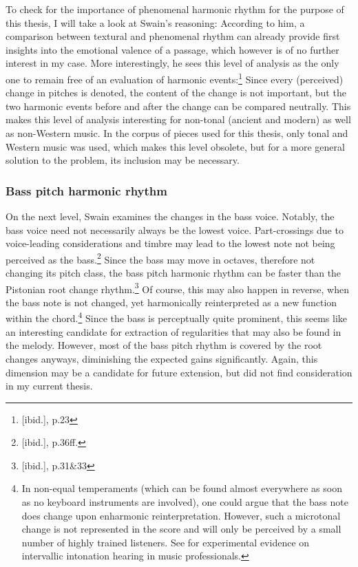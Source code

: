 \documentclass[a4paper,12pt]{report}
\begin{document}
To check for the importance of phenomenal harmonic rhythm for the purpose of this thesis, I will take a look at Swain's reasoning: According to him, a comparison between textural and phenomenal rhythm can already provide first insights into the emotional valence of a passage, which however is of no further interest in my case. More interestingly, he sees this level of analysis as the only one to remain free of an evaluation of harmonic events:\footnote{[ibid.], p.23} Since every (perceived) change in pitches is denoted, the content of the change is not important, but the two harmonic events before and after the change can be compared neutrally. This makes this level of analysis interesting for non-tonal (ancient and modern) as well as non-Western music. In the corpus of pieces used for this thesis, only tonal and Western music was used, which makes this level obsolete, but for a more general solution to the problem, its inclusion may be necessary.

\subsubsection{Bass pitch harmonic rhythm}
On the next level, Swain examines the changes in the bass voice. Notably, the bass voice need not necessarily always be the lowest voice. Part-crossings due to voice-leading considerations and timbre may lead to the lowest note not being perceived as the bass.\footnote{[ibid.], p.36ff.} Since the bass may move in octaves, therefore not changing its pitch class, the bass pitch harmonic rhythm can be faster than the Pistonian root change rhythm.\footnote{[ibid.], p.31\&33} Of course, this may also happen in reverse, when the bass note is not changed, yet harmonically reinterpreted as a new function within the chord.\footnote{In non-equal temperaments (which can be found almost everywhere as soon as no keyboard instruments are involved), one could argue that the bass note does change upon enharmonic reinterpretation. However, such a microtonal change is not represented in the score and will only be perceived by a small number of highly trained listeners. See \cite{szende1977intervallic} for experimental evidence on intervallic intonation hearing in music professionals.} Since the bass is perceptually quite prominent, this seems like an interesting candidate for extraction of regularities that may also be found in the melody. However, most of the bass pitch rhythm is covered by the root changes anyways, diminishing the expected gains significantly. Again, this dimension may be a candidate for future extension, but did not find consideration in my current thesis.
\end{document}
